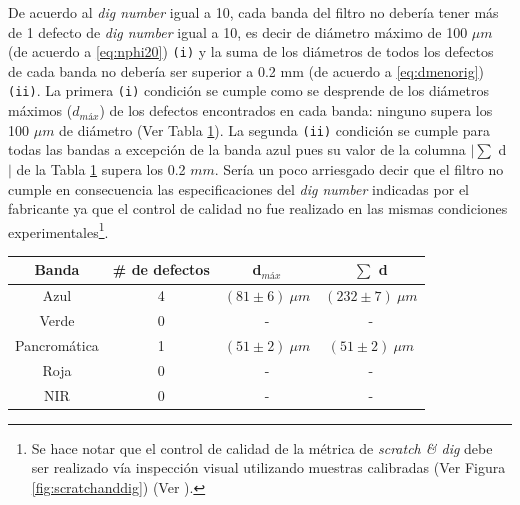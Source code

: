 De acuerdo al \textit{dig number} igual a 10, cada banda del filtro no debería tener más de 1 defecto de \textit{dig number} igual a 10, es decir de diámetro máximo de 100 $\mu m$  (de acuerdo a \ref{eq:nphi20}) \texttt{(i)} y la suma de los diámetros de todos los defectos de cada banda no debería ser superior a 0.2 mm (de acuerdo a \ref{eq:dmenorig}) \texttt{(ii)}. La primera \texttt{(i)} condición se cumple como se desprende de los diámetros máximos ($d_{máx}$) de los defectos encontrados en cada banda: ninguno supera los 100 $\mu m$ de diámetro (Ver Tabla \ref{tabress}). La segunda \texttt{(ii)} condición se cumple para todas las bandas a excepción de la banda azul pues su valor de la columna $|\sum$ d $|$ de la Tabla \ref{tabress} supera los 0.2 $mm$. Sería un poco arriesgado decir que el filtro no cumple en consecuencia las especificaciones del \textit{dig number}  indicadas por el fabricante ya que el control de calidad no fue realizado en las mismas condiciones experimentales\footnote{Se hace notar que el control de calidad de la métrica de \textit{scratch \& dig} debe ser realizado vía inspección visual utilizando muestras calibradas (Ver Figura \ref{fig:scratchanddig}) (Ver \cite{smm}).}.
 \begin{table}[H]
\begin{center}
\begin{tabular}{ |c|c|c|c| }    \toprule
Banda & \# de defectos & d$_{máx}$ & $\sum$ d\\\midrule
\rowcolor{blue!15} Azul    & 4 & $(81 \pm 6)~\mu m$ & $(232 \pm 7)~\mu m$   \\ 
\rowcolor{green!50} Verde  & 0 & - & - \\ 
Pancromática& 1 & $(51 \pm 2)~\mu m$ & $(51 \pm 2)~\mu m$  \\
\rowcolor{red!50} Roja & 0 & -  & -  \\
\rowcolor{maroon!20} NIR & 0 & -  & - \\
\bottomrule
 \hline
\end{tabular}
\end{center}
 \label{tabress}
 \end{table}
